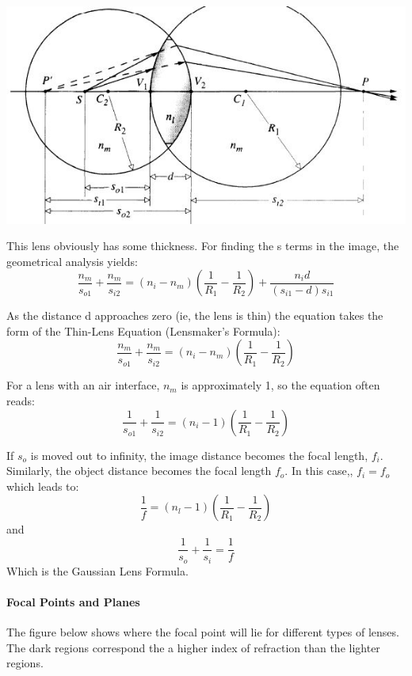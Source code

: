\documentclass[12pt]{report}
\begin{document}
\includegraphics[scale=.75]{ThinLens.jpg}

This lens obviously has some thickness. For finding the s terms in the image, the geometrical analysis yields: \[\frac{n_m}{s_{o1}}+\frac{n_m}{s_{i2}} = (n_i-n_m)\left(\frac{1}{R_1}-\frac{1}{R_2}\right)+\frac{n_id}{(s_{i1}-d)s_{i1}} \]

As the distance d approaches zero (ie, the lens is thin) the equation takes the form of the Thin-Lens Equation (Lensmaker's Formula):
\begin{equation}
\frac{n_m}{s_{o1}}+\frac{n_m}{s_{i2}} = (n_i-n_m)\left(\frac{1}{R_1}-\frac{1}{R_2}\right)
\end{equation}

For a lens with an air interface, $n_m$ is approximately 1, so the equation often reads:
\[\frac{1}{s_{o1}}+\frac{1}{s_{i2}} = (n_i-1)\left(\frac{1}{R_1}-\frac{1}{R_2}\right)\]

If $s_o$ is moved out to infinity, the image distance becomes the focal length, $f_i$. Similarly, the object distance becomes the focal length $f_o$. In this case,, $f_i = f_o$ which leads to:
\begin{equation}
\frac{1}{f} = (n_l - 1)\left(\frac{1}{R_1}-\frac{1}{R_2}\right)
\end{equation}
and
\begin{equation}
\frac{1}{s_o}+\frac{1}{s_i} = \frac{1}{f}
\end{equation}
Which is the Gaussian Lens Formula. 

\paragraph{Focal Points and Planes}

The figure below shows where the focal point will lie for different types of lenses. The dark regions correspond the a higher index of refraction than the lighter regions. 
\end{document}
